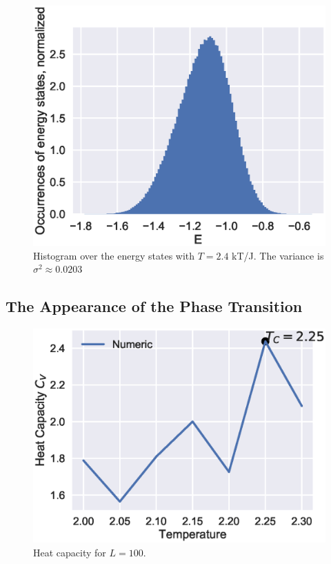 \documentclass[aps,reprint]{revtex4-1}
\begin{document}
\begin{figure}[H]
  \centering
  \includegraphics[width=\columnwidth]{figures/4db.eps}
  \caption{\label{fig:4db} Histogram over the energy states with \(T=2.4\) kT/J.
  The variance is \(\sigma^{2} \approx 0.0203\)}
\end{figure}

\subsection{The Appearance of the Phase Transition}
\label{sec:appe-phase-trans}



\begin{figure}[H]
  \centering
  \includegraphics[width=\columnwidth]{figures/L100Cv.eps}
  \caption{\label{fig:100CVTc} Heat capacity for \(L=100\).}
\end{figure}
\end{document}

